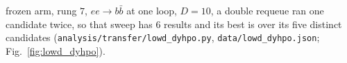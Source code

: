 \documentclass[11pt]{article}
\newcommand{\code}[1]{\texttt{#1}}
\begin{document}
frozen arm, rung $7$, $ee\to b\bar b$ at one loop, $D=10$, a double requeue ran one candidate twice, so that sweep has
$6$ results and its best is over its five distinct candidates (\code{analysis/transfer/lowd\_dyhpo.py},
\code{data/lowd\_dyhpo.json}; Fig.~\ref{fig:lowd_dyhpo}).
\end{document}
